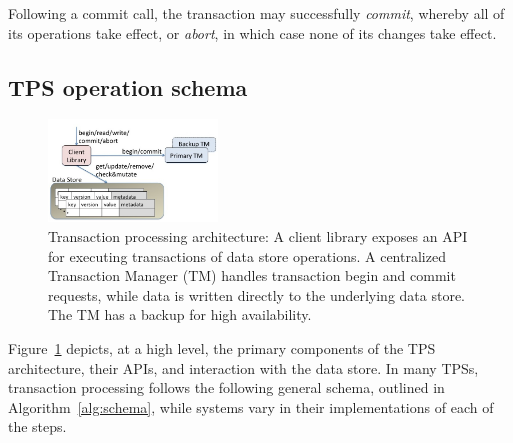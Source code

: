 Following a commit call, the transaction may successfully \emph{commit}, whereby all of its operations take effect, 
or 
\emph{abort}, in which case none of its changes take effect. 








\subsection{TPS operation schema}
\label{ssec:schema}

\begin{figure}
\centerline{
\includegraphics[width=0.40\textwidth]{FragolaComponents.jpg}
}
\caption{\small Transaction processing architecture: A client library exposes an  API for  executing transactions of data store operations. 
A centralized Transaction Manager (TM) handles transaction begin and commit requests, while data is written directly to the 
underlying data store. The TM has a backup for high availability.}
\label{fig:components}
\end{figure}

Figure~\ref{fig:components} depicts, at a high level, the primary components of the TPS architecture,  
their APIs, and interaction with the data store. 
In many TPSs, transaction processing follows the following general schema, 
outlined in Algorithm~\ref{alg:schema}, while systems vary in their implementations of each of the steps.


